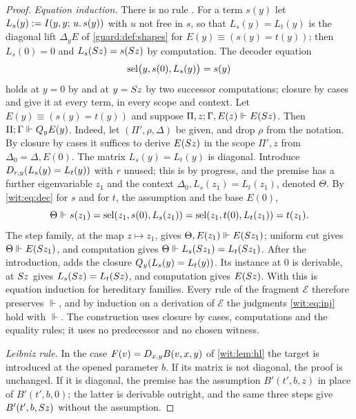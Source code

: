 \begin{proof}
\emph{Equation induction.}  There is no rule .  For a term
$s(y)$ let $L_s(y)\mathrel{:=}I(y,y;\,u.\,s(y))$ with $u$ not free in $s$, so
that $L_s(y)=L_t(y)$ is the diagonal lift $\Delta_yE$ of
\cref{guard:def:shapes} for $E(y)\equiv(s(y)=t(y))$; then $L_s(0)=0$ and
$L_s(S z)=s(S z)$ by computation.  The decoder equation
\begin{equation}
 \operatorname{sel}\bigl(y,s(0),L_s(y)\bigr)=s(y)
 \label{wit:eq:dec}
\end{equation}
holds at $y=0$ by  and at $y=S z$ by two successor
computations; closure by cases and  give it at every term, in
every scope and context.  Let $E(y)\equiv(s(y)=t(y))$ and suppose
$\Pi,z;\Gamma,E(z)\Vdash E(S z)$.  Then $\Pi;\Gamma\Vdash Q_{y}E(y)$.
Indeed, let $(\Pi',\rho,\Delta)$ be given, and drop $\rho$ from the
notation.  By closure by cases it suffices to derive $E(S z)$ in the
scope $\Pi',z$ from $\Delta_0=\Delta,E(0)$.  The matrix
$L_s(y)=L_t(y)$ is diagonal.  Introduce $D_{r,y}(L_s(y)=L_t(y))$ with $r$
unused; this is by progress, and the premise has a further eigenvariable
$z_1$ and the context $\Delta_0,L_s(z_1)=L_t(z_1)$, denoted $\Theta$.  By
\eqref{wit:eq:dec} for $s$ and for $t$, the assumption and the base $E(0)$,
\[
 \Theta\Vdash s(z_1)=\operatorname{sel}(z_1,s(0),L_s(z_1))
       =\operatorname{sel}(z_1,t(0),L_t(z_1))=t(z_1).
\]
The step family, at the map $z\mapsto z_1$, gives
$\Theta,E(z_1)\Vdash E(S z_1)$; uniform cut gives
$\Theta\Vdash E(S z_1)$, and computation gives
$\Theta\Vdash L_s(S z_1)=L_t(S z_1)$.  After the introduction,
 adds the closure $Q_{y}(L_s(y)=L_t(y))$.  Its instance at $0$
is derivable,  at $S z$ gives
$L_s(S z)=L_t(S z)$, and computation gives $E(S z)$.  With
 this is equation induction for hereditary families.  Every
rule of the fragment $\mathcal E$ therefore preserves $\Vdash$, and by
induction on a derivation of $\mathcal E$ the judgments \eqref{wit:eq:inj}
hold with $\Vdash$.  The construction uses closure by cases, computations
and the equality rules; it uses no predecessor and no chosen witness.

\emph{Leibniz rule.}  In the case $F(v)=D_{x,y}B(v,x,y)$ of
\cref{wit:lem:hl} the target is introduced at the opened parameter $b$.  If
its matrix is not diagonal, the proof is unchanged.  If it is diagonal, the
premise has the assumption $B'(t',b,z)$ in place of $B'(t',b,0)$; the
latter is derivable outright, and the same three steps give
$B'(t',b,S z)$ without the assumption.


\end{proof}
